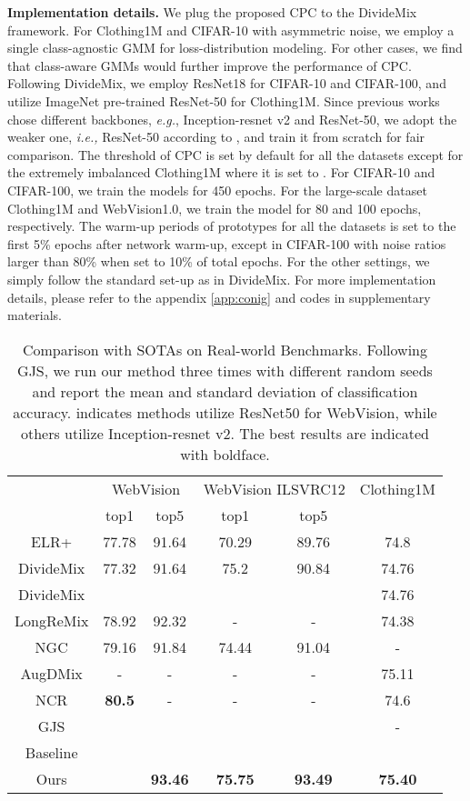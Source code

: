 \documentclass{article} \usepackage{iclr2023_conference,times}
\begin{document}
\textbf{Implementation details.} We plug the proposed CPC to the DivideMix \citep{Li2020DivideMixLW} framework. For Clothing1M and CIFAR-10 with asymmetric noise, we employ a single class-agnostic GMM for loss-distribution modeling. For other cases, we find that  class-aware GMMs would further improve the performance of CPC. Following DivideMix, we employ ResNet18 \citep{he2016identity} for CIFAR-10 and CIFAR-100, and utilize ImageNet pre-trained ResNet-50 for Clothing1M. Since previous works chose different backbones, \emph{e.g.}, Inception-resnet v2 \citep{szegedy2017inception} and ResNet-50, we adopt the weaker one, \emph{i.e.,} ResNet-50 according to \citep{DBLP:journals/corr/abs-2103-13646}, and train it from scratch for fair comparison. The threshold of CPC  is set  by default for all the datasets except for the extremely imbalanced Clothing1M where it is set to . For CIFAR-10 and CIFAR-100, we train the models for 450 epochs. For the large-scale dataset Clothing1M and WebVision1.0, we train the model for 80 and 100 epochs, respectively. The warm-up periods of prototypes for all the datasets is set to the first 5\% epochs after network warm-up, except in CIFAR-100 with noise ratios larger than 80\% when set to 10\% of total epochs. For the other settings, we simply follow the standard set-up as in DivideMix. For more implementation details, please refer to the appendix \ref{app:conig} and codes in supplementary materials.
\begin{table}[h]
\vspace{-1\baselineskip}
\caption{Comparison with SOTAs on Real-world Benchmarks. Following GJS\citep{englesson2021generalized}, we run our method three times with different random seeds and report the mean and standard deviation of classification accuracy.  indicates methods utilize ResNet50 for WebVision, while others utilize Inception-resnet v2. The best results are indicated with  boldface.}
\label{table-sota-real}
\small
\begin{center}
\begin{tabular}{c|cc|cc|c}
& \multicolumn{2}{c|}{WebVision} & \multicolumn{2}{c|}{WebVision  ILSVRC12} & Clothing1M  \\
 & top1 & top5 & top1 & top5 &  \\ \midrule
ELR+ & 77.78 & 91.64 & 70.29 & 89.76 & 74.8 \\
DivideMix & 77.32 & 91.64 & 75.2 & 90.84 & 74.76 \\
DivideMix &  &  &  &  & 74.76 \\
LongReMix & 78.92 & 92.32 & - & - & 74.38 \\
NGC & 79.16 & 91.84 & 74.44 & 91.04 & - \\
AugDMix & - & - & - & - & 75.11 \\
NCR & \textbf{80.5} & - & - & - & 74.6 \\
GJS &  &  &  &  & - \\ \midrule
Baseline &  &  &  &  &  \\
Ours &  & \textbf{93.46} & \textbf{75.75} & \textbf{93.49} & \textbf{75.40} 
\end{tabular}\end{center}
\vspace{-2\baselineskip}
\end{table}
\end{document}
